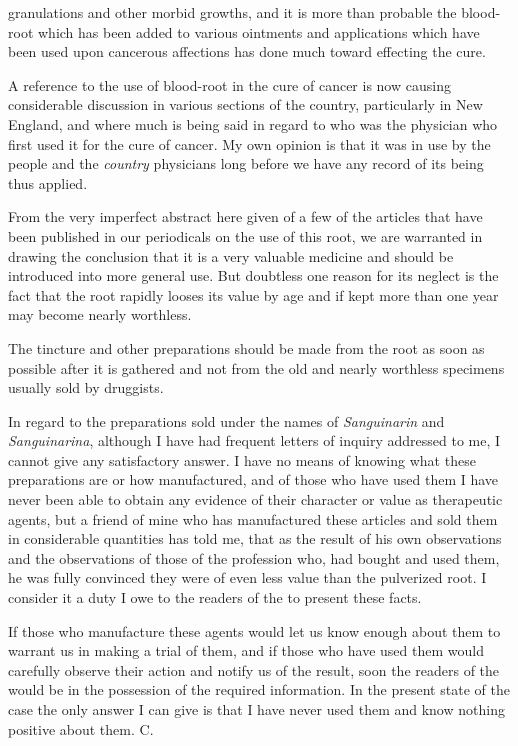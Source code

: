 granulations and other morbid growths, and it is more than probable
the blood-root which has been added to various ointments and
applications which have been used upon cancerous affections has done
much toward effecting the cure.

A reference to the use of blood-root in the cure of cancer is now
causing considerable discussion in various sections of the country, particularly
in New England, and where much is being said in regard to
who was the physician who first used it for the cure of cancer. My
own opinion is that it was in use by the people and the \emph{country} physicians
long before we have any record of its being thus applied.

From the very imperfect abstract here given of a few of the articles
that have been published in our periodicals on the use of this root, we are
warranted in drawing the conclusion that it is a very valuable medicine
and should be introduced into more general use. But doubtless one
reason for its neglect is the fact that the root rapidly looses its value by
age and if kept more than one year may become nearly worthless.

The tincture and other preparations should be made from the root as
soon as possible after it is gathered and not from the old and nearly
worthless specimens usually sold by druggists.

In regard to the preparations sold under the names of \emph{Sanguinarin}
and \emph{Sanguinarina}, although I have had frequent letters of inquiry
addressed to me, I cannot give any satisfactory answer. I have no
means of knowing what these preparations are or how manufactured,
and of those who have used them I have never been able to obtain any
evidence of their character or value as therapeutic agents, but a friend
of mine who has manufactured these articles and sold them in considerable
quantities has told me, that as the result of his own observations
and the observations of those of the profession who, had bought and
used them, he was fully convinced they were of even less value than
the pulverized root. I consider it a duty I owe to the readers of the
 to present these facts.

If those who manufacture these agents would let us know enough
about them to warrant us in making a trial of them, and if those who
have used them would carefully observe their action and notify us of
the result, soon the readers of the  would be in the possession
of the required information. In the present state of the case the only
answer I can give is that I have never used them and know nothing
positive about them. \hfill{}C.\quad\endinput
